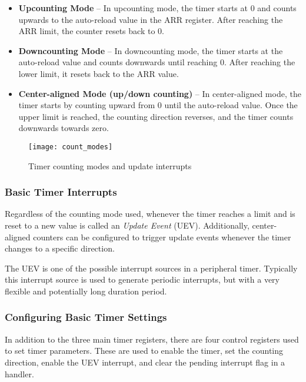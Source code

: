 \documentclass[11pt,fleqn]{book} %
\begin{document}
    \begin{itemize}
        \item \textbf{Upcounting Mode} --  In upcounting mode, the timer starts at 0 and counts upwards to the auto-reload value in the ARR register. After reaching the ARR limit, the counter resets back to 0. 
        \item \textbf{Downcounting Mode} -- In downcounting mode, the timer starts at the auto-reload value and counts downwards until reaching 0. After reaching the lower limit, it resets back to the ARR value.
        \item \textbf{Center-aligned Mode (up/down counting)} -- In center-aligned mode, the timer starts by counting upward from 0 until the auto-reload value. Once the upper limit is reached, the counting direction reverses, and the timer counts downwards towards zero.
    \end{itemize}

    \begin{figure}[]
        \centering\texttt{[image: count\_modes]}
        \caption{Timer counting modes and update interrupts}
        \label{count_modes}
    \end{figure}
    
    \subsubsection{Basic Timer Interrupts}
    
    Regardless of the counting mode used, whenever the timer reaches a limit and is reset to a new value is called an \textit{Update Event} (UEV). Additionally, center-aligned counters can be configured to trigger update events whenever the timer changes to a specific direction. 
    
    The UEV is one of the possible interrupt sources in a peripheral timer. Typically this interrupt source is used to generate periodic interrupts, but with a very flexible and potentially long duration period.
    
    
    \subsubsection{Configuring Basic Timer Settings}
    In addition to the three main timer registers, there are four control registers used to set timer parameters. These are used to enable the timer, set the counting direction, enable the UEV interrupt, and clear the pending interrupt flag in a handler. 
    
\end{document}
